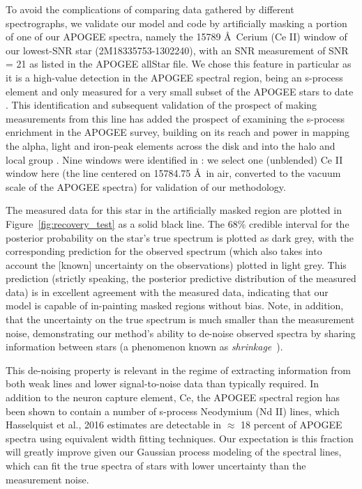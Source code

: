 \documentclass[a4paper,fleqn,usenatbib]{mnras}
\begin{document}
To avoid the complications of comparing data gathered by different spectrographs, we validate our model and code by artificially masking a portion of one of our APOGEE spectra, namely the 15789 \AA\ Cerium (Ce II) window of our lowest-SNR star (2M18335753-1302240), with an SNR measurement of SNR = 21 as listed in the APOGEE allStar file. We chose this feature in particular as it is a high-value detection in the APOGEE spectral region, being an s-process element and only measured for a very small subset of the APOGEE stars to date \citep{Cunha2017}. This identification \citep{Cunha2017} and subsequent validation of the prospect of making measurements from this line has added the prospect of examining the s-process enrichment in the APOGEE survey, building on its reach and power in mapping the alpha, light and iron-peak elements across the disk and into the halo and local group \citep[e.g.,][]{Majewski2017, Nidever2014, Hayden2015, Weinberg2019}. Nine windows were identified in \citet{Cunha2017}: we select one (unblended) Ce II window here (the line centered on 15784.75 \AA\ in air, converted to the vacuum scale of the APOGEE spectra) for validation of our methodology. 


The measured data for this star in the artificially masked region are plotted in Figure~\ref{fig:recovery_test} as a solid black line. The 68\% credible interval for the posterior probability on the star's true spectrum is plotted as dark grey, with the corresponding prediction for the observed spectrum (which also takes into account the [known] uncertainty on the observations) plotted in light grey. This prediction (strictly speaking, the posterior predictive distribution of the measured data) is in excellent agreement with the measured data, indicating that our model is capable of in-painting masked regions without bias. Note, in addition, that the uncertainty on the true spectrum is much smaller than the measurement noise, demonstrating our method's ability to de-noise observed spectra by sharing information between stars (a phenomenon known as {\it shrinkage}~\citep[see, e.g.,][Chapter 13]{Busemeyer_etal:2015}).

This de-noising property is relevant in the regime of extracting information from both weak lines and lower signal-to-noise data than typically required. In addition to the neuron capture element, Ce, the APOGEE spectral region has been shown to contain a number of s-process Neodymium (Nd II) lines, which Hasselquist et al., 2016 estimates are detectable in $\approx$ 18 percent of APOGEE spectra using equivalent width fitting techniques. Our expectation is this fraction will greatly improve given our Gaussian process modeling of the spectral lines, which can fit the true spectra of stars with lower uncertainty than the measurement noise. 
\end{document}
